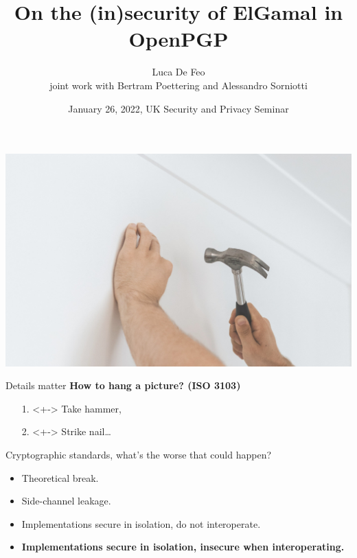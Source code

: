 \documentclass[aspectratio=169]{beamer}
\title{On the (in)security of ElGamal in OpenPGP}
\author[Luca De Feo]{Luca De Feo\\
  \small joint work with Bertram Poettering and Alessandro Sorniotti}
\date[Jan 26, 2022, UK-SPS]{January 26, 2022, UK Security and Privacy Seminar}
\institute[IBM Research]{IBM Research Zürich}
\begin{document}
\frame[plain]{\titlepage}

{
  {
    \includegraphics[width=\paperwidth,height=\paperheight]{hammer.jpg}
  }
  \begin{frame}{\Large Details matter}
    \Large
    \textbf{How to hang a picture? (ISO 3103\textonehalf)}
    \pause
    \bigskip
    \begin{itemize}
      \setlength{\itemsep}{1em}
    \item[1.]<+-> Take hammer,
    \item[2.]<+-> Strike nail\dots
    \end{itemize}
    \vspace{3cm}
  \end{frame}
}


\begin{frame}{Cryptographic standards, what's the worse that could happen?}
  \large
  \begin{itemize}
    \setlength{\itemsep}{1.2em}
  \item<+-> Theoretical break.
  \item<+-> Side-channel leakage.
  \item<+-> Implementations secure in isolation, do not interoperate.
  \item<+-> \bf Implementations secure in isolation, insecure when
    interoperating.
  \end{itemize}
\end{frame}

\end{document}
